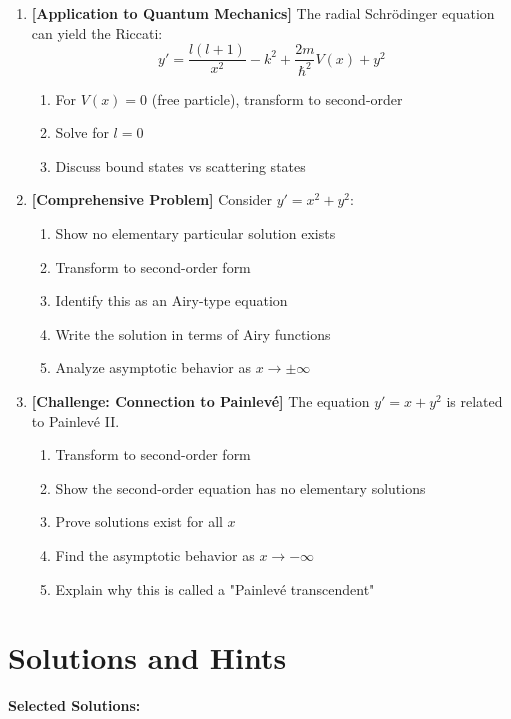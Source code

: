 \documentclass[12pt]{article}
\begin{document}
\begin{enumerate}[resume]
    \item \textbf{[Application to Quantum Mechanics]}
    The radial Schrödinger equation can yield the Riccati:
    $$y' = \frac{l(l+1)}{x^2} - k^2 + \frac{2m}{\hbar^2}V(x) + y^2$$
    \begin{enumerate}[label=(\alph*)]
        \item For $V(x) = 0$ (free particle), transform to second-order
        \item Solve for $l = 0$
        \item Discuss bound states vs scattering states
    \end{enumerate}

    \item \textbf{[Comprehensive Problem]}
    Consider $y' = x^2 + y^2$:
    \begin{enumerate}[label=(\alph*)]
        \item Show no elementary particular solution exists
        \item Transform to second-order form
        \item Identify this as an Airy-type equation
        \item Write the solution in terms of Airy functions
        \item Analyze asymptotic behavior as $x \to \pm\infty$
    \end{enumerate}

    \item \textbf{[Challenge: Connection to Painlevé]}
    The equation $y' = x + y^2$ is related to Painlevé II.
    \begin{enumerate}[label=(\alph*)]
        \item Transform to second-order form
        \item Show the second-order equation has no elementary solutions
        \item Prove solutions exist for all $x$
        \item Find the asymptotic behavior as $x \to -\infty$
        \item Explain why this is called a "Painlevé transcendent"
    \end{enumerate}
\end{enumerate}

\section*{Solutions and Hints}

\textbf{Selected Solutions:}
\end{document}
